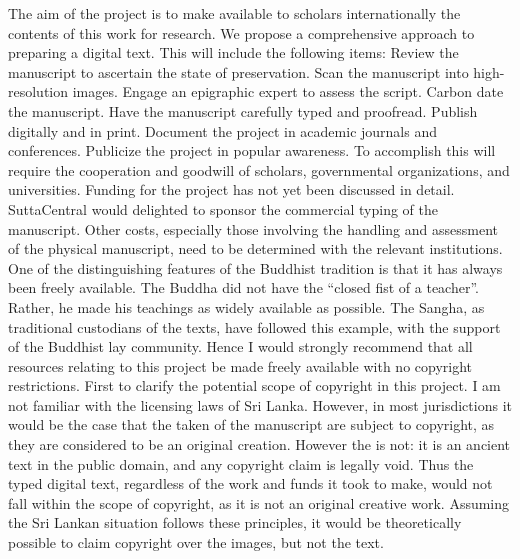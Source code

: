 {}The aim of the project is to make available to scholars internationally the contents of this work for research. We propose a comprehensive approach to preparing a digital text. This will include the following items:\markdownRendererInterblockSeparator
{}\markdownRendererUlBegin
\markdownRendererUlItem Review the manuscript to ascertain the state of preservation.\markdownRendererUlItemEnd 
\markdownRendererUlItem Scan the manuscript into high-resolution images.\markdownRendererUlItemEnd 
\markdownRendererUlItem Engage an epigraphic expert to assess the script.\markdownRendererUlItemEnd 
\markdownRendererUlItem Carbon date the manuscript.\markdownRendererUlItemEnd 
\markdownRendererUlItem Have the manuscript carefully typed and proofread.\markdownRendererUlItemEnd 
\markdownRendererUlItem Publish digitally and in print.\markdownRendererUlItemEnd 
\markdownRendererUlItem Document the project in academic journals and conferences.\markdownRendererUlItemEnd 
\markdownRendererUlItem Publicize the project in popular awareness.\markdownRendererUlItemEnd 
\markdownRendererUlEnd \markdownRendererInterblockSeparator
{}To accomplish this will require the cooperation and goodwill of scholars, governmental organizations, and universities.\markdownRendererInterblockSeparator
{}\markdownRendererInterblockSeparator
{}Funding for the project has not yet been discussed in detail. SuttaCentral would delighted to sponsor the commercial typing of the manuscript. Other costs, especially those involving the handling and assessment of the physical manuscript, need to be determined with the relevant institutions.\markdownRendererInterblockSeparator
{}\markdownRendererInterblockSeparator
{}One of the distinguishing features of the Buddhist tradition is that it has always been freely available. The Buddha did not have the “closed fist of a teacher”. Rather, he made his teachings as widely available as possible. The Sangha, as traditional custodians of the texts, have followed this example, with the support of the Buddhist lay community. Hence I would strongly recommend that all resources relating to this project be made freely available with no copyright restrictions.\markdownRendererInterblockSeparator
{}First to clarify the potential scope of copyright in this project. I am not familiar with the licensing laws of Sri Lanka. However, in most jurisdictions it would be the case that the  taken of the manuscript are subject to copyright, as they are considered to be an original creation. However the  is not: it is an ancient text in the public domain, and any copyright claim is legally void. Thus the typed digital text, regardless of the work and funds it took to make, would not fall within the scope of copyright, as it is not an original creative work. Assuming the Sri Lankan situation follows these principles, it would be theoretically possible to claim copyright over the images, but not the text.\markdownRendererInterblockSeparator
